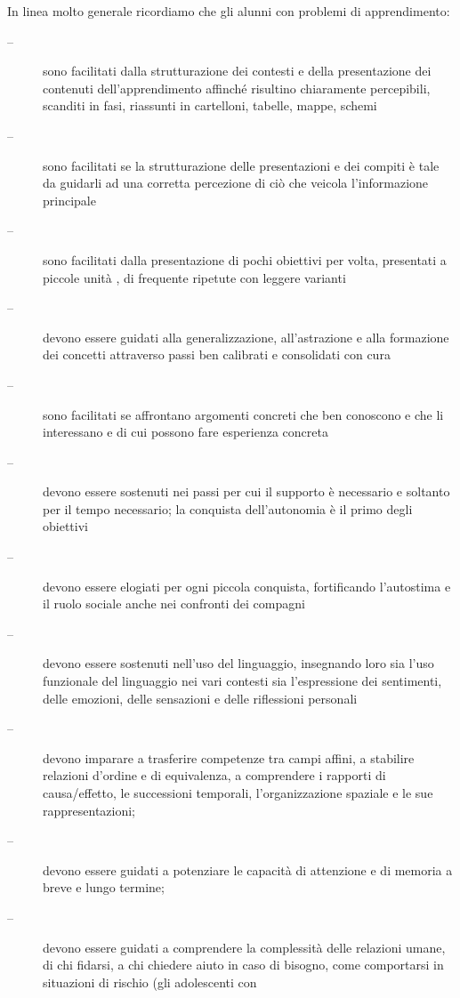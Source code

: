 \begin{description}
\begin{enumerate}
\begin{description}
 		In linea molto generale ricordiamo che gli alunni con problemi di apprendimento:
 		\begin{description}
 			\item[--] sono facilitati dalla strutturazione dei contesti e della presentazione dei contenuti
 			dell'apprendimento affinché risultino chiaramente percepibili, scanditi in fasi, riassunti in
 			cartelloni, tabelle, mappe, schemi
 			\item[--] sono facilitati se la strutturazione delle presentazioni e dei compiti è tale da guidarli ad una
 			corretta percezione di ciò che veicola l'informazione principale
 			\item[--] sono facilitati dalla presentazione di pochi obiettivi per volta, presentati a piccole unità , di
 			frequente ripetute con leggere varianti
 			\item[--] devono essere guidati alla generalizzazione, all'astrazione e alla formazione dei concetti
 			attraverso passi ben calibrati e consolidati con cura
 			\item[--] sono facilitati se affrontano argomenti concreti che ben conoscono e che li interessano e di cui
 			possono fare esperienza concreta
 			\item[--] devono essere sostenuti nei passi per cui il supporto è necessario e soltanto per il tempo
 			necessario; la conquista dell'autonomia è il primo degli obiettivi
 			\item[--] devono essere elogiati per ogni piccola conquista, fortificando l'autostima e il ruolo sociale
 			anche nei confronti dei compagni
 			\item[--] devono essere sostenuti nell'uso del linguaggio, insegnando loro sia l'uso funzionale del
 			linguaggio nei vari contesti sia l'espressione dei sentimenti, delle emozioni, delle sensazioni e
 			delle riflessioni personali
 			\item[--] devono imparare a trasferire competenze tra campi affini, a stabilire relazioni d'ordine e di
 			equivalenza, a comprendere i rapporti di causa/effetto, le successioni temporali,
 			l'organizzazione spaziale e le sue rappresentazioni;
 			\item[--] devono essere guidati a potenziare le capacità di attenzione e di memoria a breve e lungo
 			termine;
 			\item[--] devono essere guidati a comprendere la complessità delle relazioni umane, di chi fidarsi, a chi
 			chiedere aiuto in caso di bisogno, come comportarsi in situazioni di rischio (gli adolescenti con

\end{description}
\end{description}
\end{enumerate}
\end{description}
